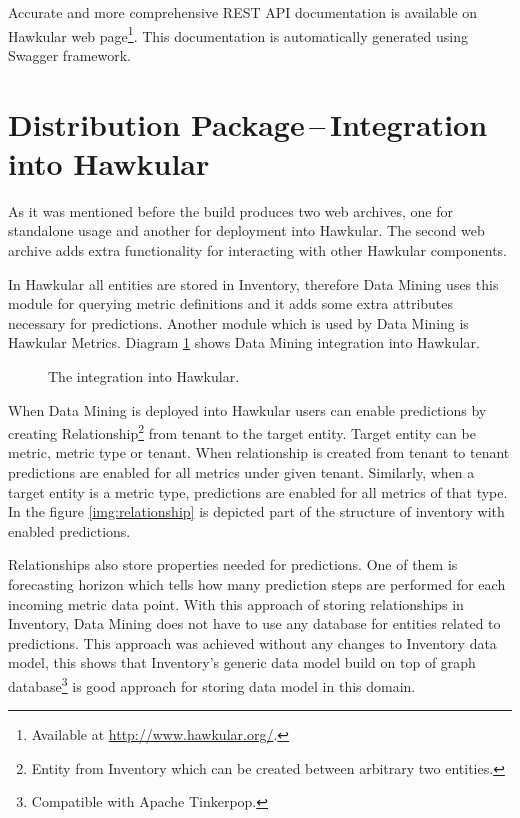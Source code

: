     Accurate and more comprehensive REST API documentation is available on Hawkular web page\footnote{Available at
    \url{http://www.hawkular.org/}.}. This documentation is automatically generated using Swagger framework.

    \section{Distribution Package\,--\,Integration into Hawkular} \label{sec:dist}
    As it was mentioned before the build produces two web archives, one for standalone usage and another for
    deployment into Hawkular. The second web archive adds extra functionality for interacting with other Hawkular
    components.

    In Hawkular all entities are stored in Inventory, therefore Data Mining uses this module
    for querying metric definitions and it adds some extra attributes necessary for predictions. Another module
    which is used by Data Mining is Hawkular Metrics. Diagram \ref{img:hawkular-interaction} shows Data Mining
    integration into Hawkular.

    \begin{figure}[H]
        \begin{center}
            \caption{The integration into Hawkular.}
            \label{img:hawkular-interaction}
        \end{center}
    \end{figure}

    When Data Mining is deployed into Hawkular users can enable predictions by creating Relationship\footnote{Entity
    from Inventory which can be created between arbitrary two entities.} from tenant to the target entity. Target
    entity can be metric, metric type or tenant. When relationship is created from tenant to tenant predictions are
    enabled for all metrics under given tenant. Similarly, when a target entity is a metric type, predictions are
    enabled for all metrics of that type. In the figure \ref{img:relationship} is depicted part of the structure of
    inventory with enabled predictions.

    Relationships also store properties needed for predictions. One of them is forecasting horizon which tells how
    many prediction steps are performed for each incoming metric data point. With this approach of storing
    relationships in Inventory, Data Mining does not have to use any database for entities related to predictions.
    This approach was achieved without any changes to Inventory data model, this shows that Inventory's generic data
    model build on top of graph database\footnote{Compatible with Apache Tinkerpop.} is good approach for storing data
    model in this domain.

